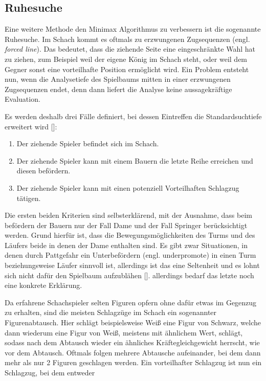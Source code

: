\subsection{Ruhesuche}

Eine weitere Methode den Minimax Algorithmus zu verbessern ist die sogenannte Ruhesuche.
Im Schach kommt es oftmals zu erzwungenen Zugsequenzen (engl. \textit{forced line}).
Das bedeutet, dass die ziehende Seite eine eingeschränkte Wahl hat zu ziehen, zum Beispiel weil der eigene König im Schach steht, oder weil dem Gegner sonst eine vorteilhafte Position ermöglicht wird.
Ein Problem entsteht nun, wenn die Analysetiefe des Spielbaums mitten in einer erzwungenen Zugsequenzen endet, denn dann liefert die Analyse keine aussagekräftige Evaluation.

Es werden deshalb drei Fälle definiert, bei dessen Eintreffen die Standardsuchtiefe erweitert wird [\cite{Stuckardt}]:

\begin{enumerate}
    \item Der ziehende Spieler befindet sich im Schach.
    \item Der ziehende Spieler kann mit einem Bauern die letzte Reihe erreichen und diesen befördern.
    \item Der ziehende Spieler kann mit einen potenziell Vorteilhaften Schlagzug tätigen.
\end{enumerate}

Die ersten beiden Kriterien sind selbsterklärend, mit der Ausnahme, dass beim befördern der Bauern nur der Fall Dame und der Fall Springer berücksichtigt werden.
Grund hierfür ist, dass die Bewegungsmöglichkeiten des Turms und des Läufers beide in denen der Dame enthalten sind.
Es gibt zwar Situationen, in denen durch Pattgefahr ein Unterbefördern (engl. underpromote) in einen Turm beziehungsweise Läufer sinnvoll ist, allerdings ist das eine Seltenheit und es lohnt sich nicht dafür den Spielbaum aufzublähen [\cite{Stuckardt}].
allerdings bedarf das letzte noch eine konkrete Erklärung.

Da erfahrene Schachspieler selten Figuren opfern ohne dafür etwas im Gegenzug zu erhalten, sind die meisten Schlagzüge im Schach ein sogenannter Figurenabtausch.
Hier schlägt beispielsweise Weiß eine Figur von Schwarz, welche dann wiederum eine Figur von Weiß, meistens mit ähnlichem Wert, schlägt, sodass nach dem Abtausch wieder ein ähnliches Kräftegleichgewicht herrscht, wie vor dem Abtausch.
Oftmals folgen mehrere Abtausche aufeinander, bei dem dann mehr als nur 2 Figuren geschlagen werden.
Ein vorteilhafter Schlagzug ist nun ein Schlagzug, bei dem entweder


